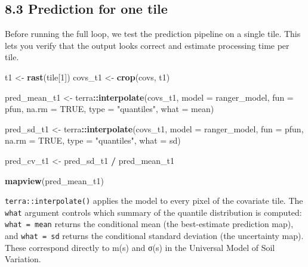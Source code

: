\documentclass[
  10pt,
  b5paper,
  oneside]{book}
\newenvironment{Shaded}{\begin{snugshade}}{\end{snugshade}}
\newcommand{\AttributeTok}[1]{\textcolor[rgb]{0.13,0.29,0.53}{#1}}
\newcommand{\ConstantTok}[1]{\textcolor[rgb]{0.56,0.35,0.01}{#1}}
\newcommand{\DecValTok}[1]{\textcolor[rgb]{0.00,0.00,0.81}{#1}}
\newcommand{\FunctionTok}[1]{\textcolor[rgb]{0.13,0.29,0.53}{\textbf{#1}}}
\newcommand{\NormalTok}[1]{#1}
\newcommand{\OtherTok}[1]{\textcolor[rgb]{0.56,0.35,0.01}{#1}}
\newcommand{\SpecialCharTok}[1]{\textcolor[rgb]{0.81,0.36,0.00}{\textbf{#1}}}
\newcommand{\StringTok}[1]{\textcolor[rgb]{0.31,0.60,0.02}{#1}}
\begin{document}
\subsection*{8.3 Prediction for one tile}\label{prediction-for-one-tile}

Before running the full loop, we test the prediction pipeline on a single tile. This lets you verify that the output looks correct and estimate processing time per tile.

\begin{Shaded}
\begin{Highlighting}[]
\NormalTok{t1       }\OtherTok{\textless{}{-}} \FunctionTok{rast}\NormalTok{(tile[}\DecValTok{1}\NormalTok{])}
\NormalTok{covs\_t1  }\OtherTok{\textless{}{-}} \FunctionTok{crop}\NormalTok{(covs, t1)}

\NormalTok{pred\_mean\_t1 }\OtherTok{\textless{}{-}}\NormalTok{ terra}\SpecialCharTok{::}\FunctionTok{interpolate}\NormalTok{(covs\_t1,}
                                   \AttributeTok{model =}\NormalTok{ ranger\_model,}
                                   \AttributeTok{fun   =}\NormalTok{ pfun,}
                                   \AttributeTok{na.rm =} \ConstantTok{TRUE}\NormalTok{,}
                                   \AttributeTok{type  =} \StringTok{"quantiles"}\NormalTok{,}
                                   \AttributeTok{what  =}\NormalTok{ mean)}

\NormalTok{pred\_sd\_t1   }\OtherTok{\textless{}{-}}\NormalTok{ terra}\SpecialCharTok{::}\FunctionTok{interpolate}\NormalTok{(covs\_t1,}
                                   \AttributeTok{model =}\NormalTok{ ranger\_model,}
                                   \AttributeTok{fun   =}\NormalTok{ pfun,}
                                   \AttributeTok{na.rm =} \ConstantTok{TRUE}\NormalTok{,}
                                   \AttributeTok{type  =} \StringTok{"quantiles"}\NormalTok{,}
                                   \AttributeTok{what  =}\NormalTok{ sd)}

\NormalTok{pred\_cv\_t1 }\OtherTok{\textless{}{-}}\NormalTok{ pred\_sd\_t1 }\SpecialCharTok{/}\NormalTok{ pred\_mean\_t1}

\FunctionTok{mapview}\NormalTok{(pred\_mean\_t1)}
\end{Highlighting}
\end{Shaded}

\texttt{terra::interpolate()} applies the model to every pixel of the covariate tile. The \texttt{what} argument controls which summary of the quantile distribution is computed: \texttt{what\ =\ mean} returns the conditional mean (the best-estimate prediction map), and \texttt{what\ =\ sd} returns the conditional standard deviation (the uncertainty map). These correspond directly to m(s) and σ(s) in the Universal Model of Soil Variation.
\end{document}
